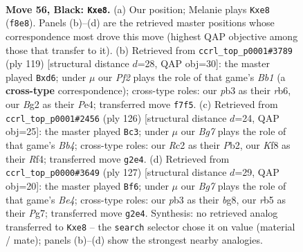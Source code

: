 \documentclass[11pt]{article}
\begin{document}
\clearpage

\begin{figure}[p]\centering
\begin{subfigure}{0.46\textwidth}\centering
\resizebox{\linewidth}{!}{%
\newchessgame
\chessboard[
  setfen={4Bk2/5p2/6p1/1R6/7P/1P6/2r3b1/R5K1 b - - 0 56},
  showmover=false,
  pgfstyle=straightmove, color=movearrow, markmove={f8-e8}
]}
\caption{}
\end{subfigure}\hfill
\begin{subfigure}{0.46\textwidth}\centering
\resizebox{\linewidth}{!}{%
\newchessgame
\chessboard[
  setfen={1b6/1P1k2p1/1R1B4/K5P1/4p3/P2p4/4r3/8 b - - 3 60},
  showmover=false,
  pgfstyle=straightmove, color=movearrow, markmove={b8-d6}
]}
\caption{}
\end{subfigure}
\\[4pt]
\begin{subfigure}{0.46\textwidth}\centering
\resizebox{\linewidth}{!}{%
\newchessgame
\chessboard[
  setfen={4k3/8/6pp/4r3/pB2bR2/7P/1P4PK/8 w - - 14 64},
  showmover=false,
  pgfstyle=straightmove, color=movearrow, markmove={b4-c3}
]}
\caption{}
\end{subfigure}\hfill
\begin{subfigure}{0.46\textwidth}\centering
\resizebox{\linewidth}{!}{%
\newchessgame
\chessboard[
  setfen={3k2B1/R5p1/8/2r1b3/1p2K3/1P4P1/8/8 b - - 19 64},
  showmover=false,
  pgfstyle=straightmove, color=movearrow, markmove={e5-f6}
]}
\caption{}
\end{subfigure}
\caption{\textbf{Move 56, Black: \texttt{Kxe8}.} (a) Our position; Melanie plays \texttt{Kxe8} (\texttt{f8e8}). Panels (b)--(d) are the retrieved master positions whose correspondence most drove this move (highest QAP objective among those that transfer to it). (b) Retrieved from \texttt{ccrl\_top\_p0001\#3789} (ply 119) [structural distance $d$=28, QAP obj=30]: the master played \texttt{Bxd6}; under $\mu$ our \emph{Pf2} plays the role of that game's \emph{Bb1} (a \textbf{cross-type} correspondence); cross-type roles: our \emph{p}b3 as their \emph{r}b6, our \emph{B}g2 as their \emph{P}e4; transferred move \texttt{f7f5}. (c) Retrieved from \texttt{ccrl\_top\_p0001\#2456} (ply 126) [structural distance $d$=24, QAP obj=25]: the master played \texttt{Bc3}; under $\mu$ our \emph{Bg7} plays the role of that game's \emph{Bb4}; cross-type roles: our \emph{R}c2 as their \emph{P}b2, our \emph{K}f8 as their \emph{R}f4; transferred move \texttt{g2e4}. (d) Retrieved from \texttt{ccrl\_top\_p0000\#3649} (ply 127) [structural distance $d$=29, QAP obj=20]: the master played \texttt{Bf6}; under $\mu$ our \emph{Bg7} plays the role of that game's \emph{Be4}; cross-type roles: our \emph{p}b3 as their \emph{b}g8, our \emph{r}b5 as their \emph{P}g7; transferred move \texttt{g2e4}. Synthesis: no retrieved analog transferred to \texttt{Kxe8} -- the \texttt{search} selector chose it on value (material / mate); panels (b)--(d) show the strongest nearby analogies.}
\label{fig:thought-m111}
\end{figure}
\end{document}
